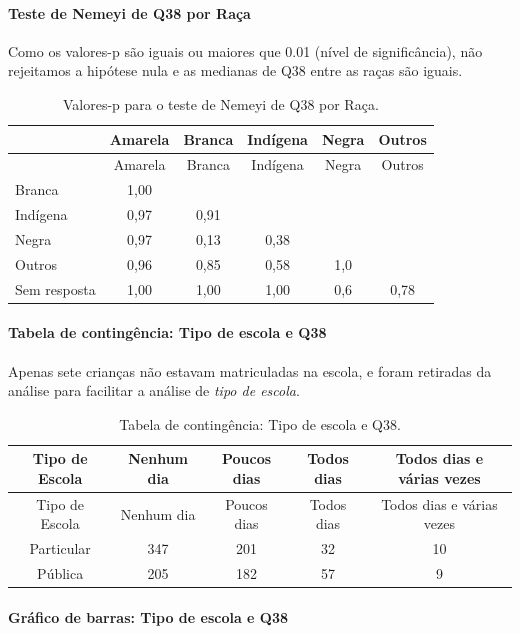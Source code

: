\documentclass[]{article}
\let\oldparagraph\paragraph
\renewcommand{\paragraph}[1]{\oldparagraph{#1}\mbox{}}
\begin{document}
\hypertarget{teste-de-nemeyi-de-q38-por-rauxe7a}{%
\paragraph{Teste de Nemeyi de Q38 por Raça}\label{teste-de-nemeyi-de-q38-por-rauxe7a}}

Como os valores-p são iguais ou maiores que 0.01 (nível de significância), não rejeitamos a hipótese nula e as medianas de Q38 entre as raças são iguais.

\begin{longtable}[]{@{}lccccc@{}}
\caption{\label{tab:unnamed-chunk-1467}Valores-p para o teste de Nemeyi de Q38 por Raça.}\tabularnewline
\toprule
& Amarela & Branca & Indígena & Negra & Outros\tabularnewline
\midrule
\endfirsthead
\toprule
& Amarela & Branca & Indígena & Negra & Outros\tabularnewline
\midrule
\endhead
Branca & 1,00 & & & &\tabularnewline
Indígena & 0,97 & 0,91 & & &\tabularnewline
Negra & 0,97 & 0,13 & 0,38 & &\tabularnewline
Outros & 0,96 & 0,85 & 0,58 & 1,0 &\tabularnewline
Sem resposta & 1,00 & 1,00 & 1,00 & 0,6 & 0,78\tabularnewline
\bottomrule
\end{longtable}

\cleardoublepage

\hypertarget{tabela-de-continguxeancia-tipo-de-escola-e-q38}{%
\paragraph{Tabela de contingência: Tipo de escola e Q38}\label{tabela-de-continguxeancia-tipo-de-escola-e-q38}}

Apenas sete crianças não estavam matriculadas na escola, e foram retiradas da análise para facilitar a análise de \emph{tipo de escola}.

\begin{longtable}[]{@{}ccccc@{}}
\caption{\label{tab:unnamed-chunk-1468}Tabela de contingência: Tipo de escola e Q38.}\tabularnewline
\toprule
Tipo de Escola & Nenhum dia & Poucos dias & Todos dias & Todos dias e várias vezes\tabularnewline
\midrule
\endfirsthead
\toprule
Tipo de Escola & Nenhum dia & Poucos dias & Todos dias & Todos dias e várias vezes\tabularnewline
\midrule
\endhead
Particular & 347 & 201 & 32 & 10\tabularnewline
Pública & 205 & 182 & 57 & 9\tabularnewline
\bottomrule
\end{longtable}

\hypertarget{gruxe1fico-de-barras-tipo-de-escola-e-q38}{%
\paragraph{Gráfico de barras: Tipo de escola e Q38}\label{gruxe1fico-de-barras-tipo-de-escola-e-q38}}
\end{document}
